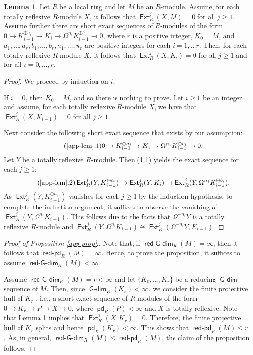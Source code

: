 \documentclass{amsart}
\theoremstyle{plain} %
\theoremstyle{definition}
\newtheorem{lem}[thm]{Lemma}
\def\Ext{\operatorname{\mathsf{Ext}}}
\def\pd{\operatorname{\mathsf{pd}}}
\DeclareMathOperator{\Gdim}{\mathsf{G-dim}}
\DeclareMathOperator{\rGdim}{\operatorname{\mathsf{red-G-dim}}}
\DeclareMathOperator{\rpdim}{\operatorname{\mathsf{red-pd}}}
\begin{document}
\begin{lem} \label{app-lem} Let $R$ be a local ring and let $M$ be an $R$-module. Assume, for each totally reflexive $R$-module $X$, it follows that $\Ext^j_R(X, M)=0$ for all $j\geq 1$. Assume further there are short exact sequences of $R$-modules of the form $0 \to K_{i-1}^{{\oplus a_i}} \to K_{i} \to \Omega^{n_i}K_{i-1}^{{\oplus b_i}} \to 0$, where $r$ is a positive integer, $K_0=M$, and $a_1, \dots, a_r,b_1, \dots, b_r ,n_1, \dots, n_r$ are positive integers for each $i=1, \ldots r$. Then, for each totally reflexive $R$-module $X$, it follows that $\Ext^j_R(X, K_i)=0$ for all $j\geq 1$ and for all $i=0, \ldots, r$.
\end{lem}

\begin{proof} We proceed by induction on $i$. 

If $i=0$, then $K_0=M$, and so there is nothing to prove. Let $i\geq 1$ be an integer and assume, for each totally reflexive $R$-module $X$, we have that $\Ext^j_R(X, K_{i-1})=0$ for all $j\geq 1$.  

Next consider the following short exact sequence that exists by our assumption:
\begin{equation}\tag{\ref{app-lem}.1}
0 \to K_{i-1}^{{\oplus a_i}} \to K_{i} \to \Omega^{n_i}K_{i-1}^{{\oplus b_i}} \to 0.
\end{equation}
Let $Y$ be a totally reflexive $R$-module. Then (\ref{app-lem}.1) yields the exact sequence for each $j\geq 1$:
\begin{equation}\tag{\ref{app-lem}.2}
\Ext_R^{j}(Y, K_{i-1}^{{\oplus a_i}}) \to \Ext_R^{j}(Y, K_{i}) \to \Ext_R^{j}(Y, \Omega^{n_i}K_{i-1}^{{\oplus b_i}}). 
\end{equation}
As $\Ext_R^{j}(Y, K_{i-1}^{{\oplus a_i}})$ vanishes for each $j\geq 1$ by the induction hypothesis, to complete the induction argument, it suffices to observe the vanishing of $\Ext_R^{j}(Y, \Omega^{n_i}K_{i-1})$.
This follows due to the facts that $\Omega^{-n_i}Y$ is a totally reflexive $R$-module and $\Ext_R^{j}(Y, \Omega^{n_i}K_{i-1}) \cong \Ext_R^{j}(\Omega^{-n_i}Y, K_{i-1})$. 
\end{proof}

\begin{proof}[Proof of Proposition \ref{app-prop}:] \label{pp1} Note that, if $\rGdim_R(M)=\infty$, then it follows that $\rpdim_R(M)=\infty$. Hence, to prove the proposition, it suffices to assume $\rGdim_R(M)<\infty$.

Assume $\rGdim_R(M)=r<\infty$ and let $\{K_0, \ldots, K_r \}$ be a reducing $\Gdim$ sequence of $M$. Then, since $\Gdim_R(K_r)<\infty$, we consider the finite projective hull of $K_r$ \cite[1.1]{AuBu}, i.e., a short exact sequence of $R$-modules of the form $0 \to K_r \to P \to X \to 0$, where $\pd_R(P)<\infty$ and $X$ is totally reflexive. Note that Lemma \ref{app-lem} implies that $\Ext^1_R(X, K_r)=0$. Therefore, the finite projective hull of $K_r$ splits and hence $\pd_R(K_r)<\infty$. This shows that $\rpdim_R(M)\leq r$. As, in general, $\rGdim_R(M)\leq \rpdim_R(M)$, the claim of the proposition follows.
\end{proof}
\end{document}
